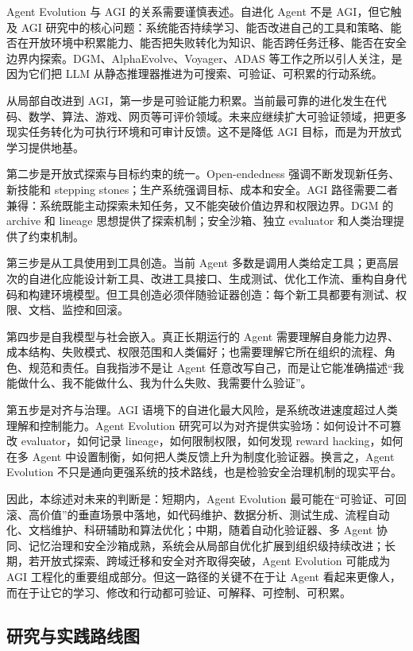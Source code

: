 Agent Evolution 与 AGI 的关系需要谨慎表述。自进化 Agent 不是 AGI，但它触及 AGI 研究中的核心问题：系统能否持续学习、能否改进自己的工具和策略、能否在开放环境中积累能力、能否把失败转化为知识、能否跨任务迁移、能否在安全边界内探索。DGM、AlphaEvolve、Voyager、ADAS 等工作之所以引人关注，是因为它们把 LLM 从静态推理器推进为可搜索、可验证、可积累的行动系统。

从局部自改进到 AGI，第一步是可验证能力积累。当前最可靠的进化发生在代码、数学、算法、游戏、网页等可评价领域。未来应继续扩大可验证领域，把更多现实任务转化为可执行环境和可审计反馈。这不是降低 AGI 目标，而是为开放式学习提供地基。

第二步是开放式探索与目标约束的统一。Open-endedness 强调不断发现新任务、新技能和 stepping stones；生产系统强调目标、成本和安全。AGI 路径需要二者兼得：系统既能主动探索未知任务，又不能突破价值边界和权限边界。DGM 的 archive 和 lineage 思想提供了探索机制；安全沙箱、独立 evaluator 和人类治理提供了约束机制。

第三步是从工具使用到工具创造。当前 Agent 多数是调用人类给定工具；更高层次的自进化应能设计新工具、改进工具接口、生成测试、优化工作流、重构自身代码和构建环境模型。但工具创造必须伴随验证器创造：每个新工具都要有测试、权限、文档、监控和回滚。

第四步是自我模型与社会嵌入。真正长期运行的 Agent 需要理解自身能力边界、成本结构、失败模式、权限范围和人类偏好；也需要理解它所在组织的流程、角色、规范和责任。自我指涉不是让 Agent 任意改写自己，而是让它能准确描述``我能做什么、我不能做什么、我为什么失败、我需要什么验证''。

第五步是对齐与治理。AGI 语境下的自进化最大风险，是系统改进速度超过人类理解和控制能力。Agent Evolution 研究可以为对齐提供实验场：如何设计不可篡改 evaluator，如何记录 lineage，如何限制权限，如何发现 reward hacking，如何在多 Agent 中设置制衡，如何把人类反馈上升为制度化验证器。换言之，Agent Evolution 不只是通向更强系统的技术路线，也是检验安全治理机制的现实平台。

因此，本综述对未来的判断是：短期内，Agent Evolution 最可能在``可验证、可回滚、高价值''的垂直场景中落地，如代码维护、数据分析、测试生成、流程自动化、文档维护、科研辅助和算法优化；中期，随着自动化验证器、多 Agent 协同、记忆治理和安全沙箱成熟，系统会从局部自优化扩展到组织级持续改进；长期，若开放式探索、跨域迁移和安全对齐取得突破，Agent Evolution 可能成为 AGI 工程化的重要组成部分。但这一路径的关键不在于让 Agent 看起来更像人，而在于让它的学习、修改和行动都可验证、可解释、可控制、可积累。

\subsection{研究与实践路线图}\label{sec:ch8-roadmap}

